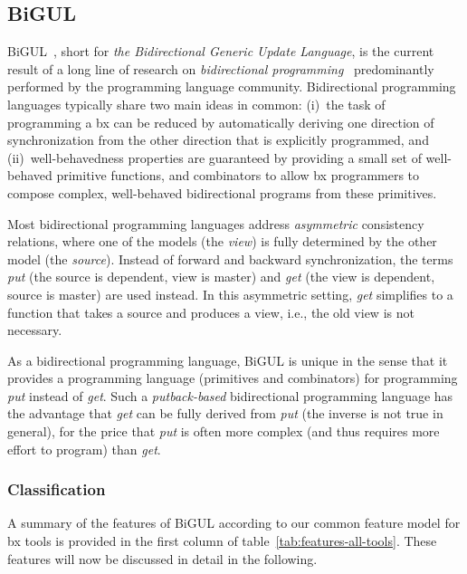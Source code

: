 \subsection{BiGUL}
\label{sec:BiGUL}


BiGUL~\cite{PEPM2016-Ko}, short for \emph{the Bidirectional Generic Update Language}, is the current result of a long line of research on \emph{bidirectional programming}~\cite{Foster2012} predominantly performed by the programming language community.
Bidirectional programming languages typically share two main ideas in common:  (i)~the task of programming a bx can be reduced by automatically deriving one direction of synchronization from the other direction that is explicitly programmed, and (ii)~well-behavedness properties are guaranteed by providing a small set of well-behaved primitive functions, and combinators to allow bx programmers to compose complex, well-behaved bidirectional programs from these primitives.

Most bidirectional programming languages address \emph{asymmetric} consistency relations, where one of the models (the \emph{view}) is fully determined by the other model (the \emph{source}).
Instead of forward and backward synchronization, the terms \emph{put} (the source is dependent, view is master) and \emph{get} (the view is dependent, source is master) are used instead.
In this asymmetric setting, \emph{get} simplifies to a function that takes a source and produces a view, i.e., the old view is not necessary. 

As a bidirectional programming language, BiGUL is unique in the sense that it provides a programming language (primitives and combinators) for programming \emph{put} instead of \emph{get}.
Such a \emph{putback-based} bidirectional programming language has the advantage that \emph{get} can be fully derived from \emph{put} (the inverse is not true in general), for the price that \emph{put} is often more complex (and thus requires more effort to program) than \emph{get}.


\subsubsection{Classification}
A summary of the features of BiGUL according to our common feature model for bx tools is provided in the first column of table~\ref{tab:features-all-tools}.
These features will now be discussed in detail in the following.

